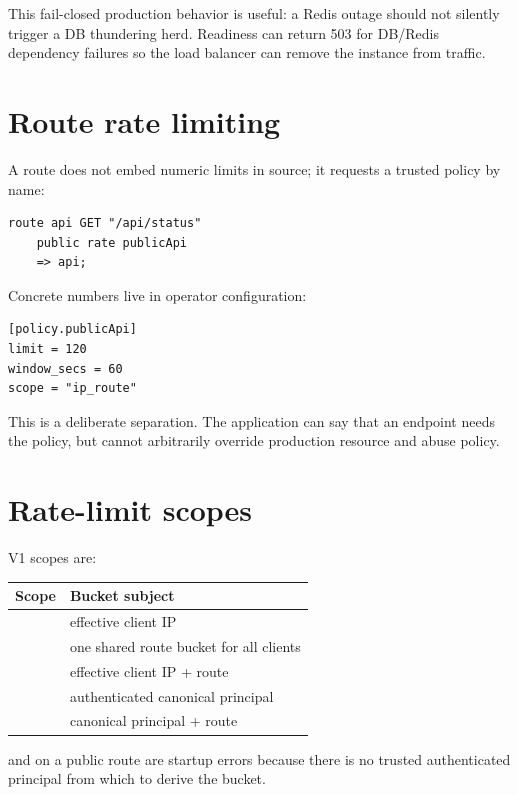 This fail-closed production behavior is useful: a Redis outage should not silently trigger a DB thundering herd. Readiness can return 503 for DB/Redis dependency failures so the load balancer can remove the instance from traffic.

\section{Route rate limiting}

A route does not embed numeric limits in source; it requests a trusted policy by name:

\begin{lstlisting}[language=Velran]
route api GET "/api/status"
    public rate publicApi
    => api;
\end{lstlisting}

Concrete numbers live in operator configuration:

\begin{lstlisting}
[policy.publicApi]
limit = 120
window_secs = 60
scope = "ip_route"
\end{lstlisting}

This is a deliberate separation. The application can say that an endpoint needs the  policy, but cannot arbitrarily override production resource and abuse policy.

\section{Rate-limit scopes}

V1 scopes are:

\begin{center}
\begin{tabularx}{\textwidth}{@{}L{0.22\textwidth}Y@{}}
\toprule
\textbf{Scope} & \textbf{Bucket subject} \\
\midrule
{} & effective client IP \\
 & one shared route bucket for all clients \\
 & effective client IP + route \\
 & authenticated canonical principal \\
 & canonical principal + route \\
\bottomrule
\end{tabularx}
\end{center}

 and  on a public route are startup errors because there is no trusted authenticated principal from which to derive the bucket.

